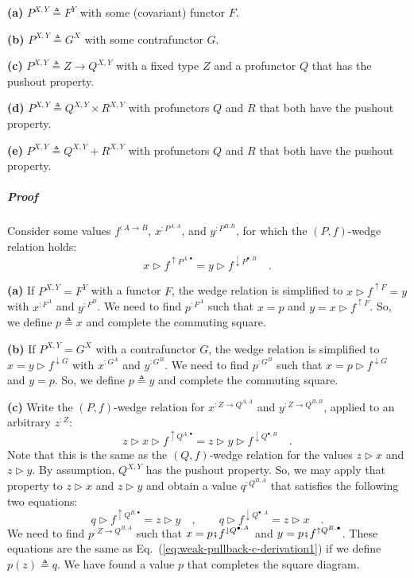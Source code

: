 \textbf{(a)} $P^{X,Y}\triangleq F^{Y}$ with some (covariant) functor
$F$.

\textbf{(b)} $P^{X,Y}\triangleq G^{X}$ with some contrafunctor $G$.

\textbf{(c)} $P^{X,Y}\triangleq Z\rightarrow Q^{X,Y}$ with a fixed
type $Z$ and a profunctor $Q$ that has the pushout property.

\textbf{(d)} $P^{X,Y}\triangleq Q^{X,Y}\times R^{X,Y}$ with profunctors
$Q$ and $R$ that both have the pushout property.

\textbf{(e)} $P^{X,Y}\triangleq Q^{X,Y}+R^{X,Y}$ with profunctors
$Q$ and $R$ that both have the pushout property.

\subparagraph{Proof}

Consider some values $f^{:A\rightarrow B}$, $x^{:P^{A,A}}$, and
$y^{:P^{B,B}}$, for which the $\left(P,f\right)$-wedge relation
holds:
\[
x\triangleright f^{\uparrow P^{A,\bullet}}=y\triangleright f^{\downarrow P^{\bullet,B}}\quad.
\]

\textbf{(a)} If $P^{X,Y}=F^{Y}$ with a functor $F$, the wedge relation
is simplified to $x\triangleright f^{\uparrow F}=y$ with $x^{:F^{A}}$
and $y^{:F^{B}}$. We need to find $p^{:F^{A}}$ such that $x=p$
and $y=x\triangleright f^{\uparrow F}$. So, we define $p\triangleq x$
and complete the commuting square.

\textbf{(b)} If $P^{X,Y}=G^{X}$ with a contrafunctor $G$, the wedge
relation is simplified to $x=y\triangleright f^{\downarrow G}$ with
$x^{:G^{A}}$ and $y^{:G^{B}}$. We need to find $p^{:G^{B}}$ such
that $x=p\triangleright f^{\downarrow G}$ and $y=p$. So, we define
$p\triangleq y$ and complete the commuting square.

\textbf{(c)} Write the $\left(P,f\right)$-wedge relation for $x^{:Z\rightarrow Q^{A,A}}$
and $y^{:Z\rightarrow Q^{B,B}}$, applied to an arbitrary $z^{:Z}$:
\[
z\triangleright x\triangleright f^{\uparrow Q^{A,\bullet}}=z\triangleright y\triangleright f^{\downarrow Q^{\bullet,B}}\quad.
\]
Note that this is the same as the $\left(Q,f\right)$-wedge relation
for the values $z\triangleright x$ and $z\triangleright y$. By assumption,
$Q^{X,Y}$ has the pushout property. So, we may apply that property
to $z\triangleright x$ and $z\triangleright y$ and obtain a value
$q^{:Q^{B,A}}$ that satisfies the following two equations:
\begin{equation}
q\triangleright f^{\uparrow Q^{B,\bullet}}=z\triangleright y\quad,\quad\quad q\triangleright f^{\downarrow Q^{\bullet,A}}=z\triangleright x\quad.\label{eq:weak-pullback-c-derivation1}
\end{equation}
We need to find $p^{:Z\rightarrow Q^{B,A}}$ such that $x=p\bef f^{\downarrow Q^{\bullet,A}}$
and $y=p\bef f^{\uparrow Q^{B,\bullet}}$. These equations are the
same as Eq.~(\ref{eq:weak-pullback-c-derivation1}) if we define
$p(z)\triangleq q$. We have found a value $p$ that completes the
square diagram.

